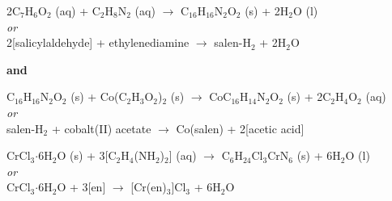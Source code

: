 
\newcommand{\super}[1]{\ensuremath{^{\textrm{#1}}}}
\newcommand{\sub}[1]{\ensuremath{_{\textrm{#1}}}}

\begin{center}
  2C\sub{7}H\sub{6}O\sub{2} (aq) + C\sub{2}H\sub{8}N\sub{2} (aq) $\rightarrow$ C\sub{16}H\sub{16}N\sub{2}O\sub{2} (s) + 2H\sub{2}O (l) \\
    \textit{or} \\
  2[salicylaldehyde] + ethylenediamine $\rightarrow$ salen-H\sub{2} + 2H\sub{2}O \bigskip

    \textbf{and} \bigskip

  C\sub{16}H\sub{16}N\sub{2}O\sub{2} (s) + Co(C\sub{2}H\sub{3}O\sub{2})\sub{2} (s) $\rightarrow$ CoC\sub{16}H\sub{14}N\sub{2}O\sub{2} (s) + 2C\sub{2}H\sub{4}O\sub{2} (aq) \\
    \textit{or} \\
  salen-H\sub{2} + cobalt(II) acetate $\rightarrow$ Co(salen) + 2[acetic acid]
\end{center}


\begin{center}
  CrCl\sub{3}$\cdot$6H\sub{2}O (s) + 3[C\sub{2}H\sub{4}(NH\sub{2})\sub{2}] (aq) $\rightarrow$ C\sub{6}H\sub{24}Cl\sub{3}CrN\sub{6} (s) + 6H\sub{2}O (l)\\
    \textit{or} \\
  CrCl\sub{3}$\cdot$6H\sub{2}O + 3[en] $\rightarrow$ [Cr(en)\sub{3}]Cl\sub{3} + 6H\sub{2}O
\end{center}


